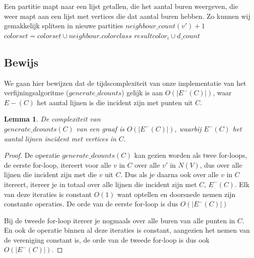 \documentclass[twoside]{article}
\newtheorem{lemma}[theorem]{Lemma}
\begin{document}
\begin{multicols}{2}
\begin{algorithm}[H]
Een partitie mapt naar een lijst getallen, die het aantal buren weergeven, die weer mapt aan een lijst met vertices die dat aantal buren hebben. Zo kunnen wij gemakkelijk splitsen in nieuwe partities \;
{
{$ neighbour\_count(v') + 1 $ \;
$ colorset = colorset \cup  neighbour.colorclass  $  \;}}
{
$ result color_{i} \cup d\_count $}
\caption{$ generate\_dcounts $}
\end{algorithm}

\subsection{Bewijs}

We gaan hier bewijzen dat de tijdscomplexiteit van onze implementatie van het verfijningsalgoritme ($generate\_dcounts$) gelijk is aan $ O(|E^{-}(C)|)$,  waar $ E{-}(C) $ het aantal lijnen is die incident zijn met punten uit $C$.

\begin{lemma}
De complexiteit van\\ $generate\_dcounts(C)$ van een graaf is $O(|E^{-}(C)|) $,  waarbij  $E^{-}(C)$ het aantal lijnen incident met vertices in $C$.
\end{lemma}

\begin{proof}
De operatie $generate\_dcounts(C) $ kan gezien worden als twee for-loops, de eerste for-loop, itereert voor alle $v$ in $C$ over alle $v'$ in $N(V)$, dus over alle lijnen die incident zijn met die $v$ uit $C$. Dus als je daarna ook over alle $v$ in $C$ itereert, itereer je in totaal over alle lijnen die incident zijn met $C$, $E^{-}(C)$. Elk van deze iteraties is constant $O(1)$ want optellen en doorsnede nemen zijn constante operaties. De orde van de eerste for-loop is dus $O(|E^{-}(C)|)$

Bij de tweede for-loop itereer je nogmaals over alle buren van alle punten in $C$. En ook de operatie binnen al deze iteraties is constant, aangezien het nemen van de vereniging constant is, de orde van de tweede for-loop is dus ook $O(|E^{-}(C)|)$.


\end{proof}
\end{multicols}
\end{document}
